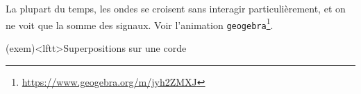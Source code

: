 \documentclass[../../main/main.tex]{subfiles}
\begin{document}
La plupart du temps, les ondes se croisent sans interagir particulièrement, et
on ne voit que la somme des signaux. Voir l'animation
\texttt{geogebra}\footnote{\url{https://www.geogebra.org/m/jyh2ZMXJ}}.
\begin{tcb}[sidebyside](exem)<lftt>{Superpositions sur une corde}
	\begin{center}
	\end{center}
	\tcblower
	\begin{center}
		\sswitch{%
}
\end{center}
\end{tcb}
\end{document}
